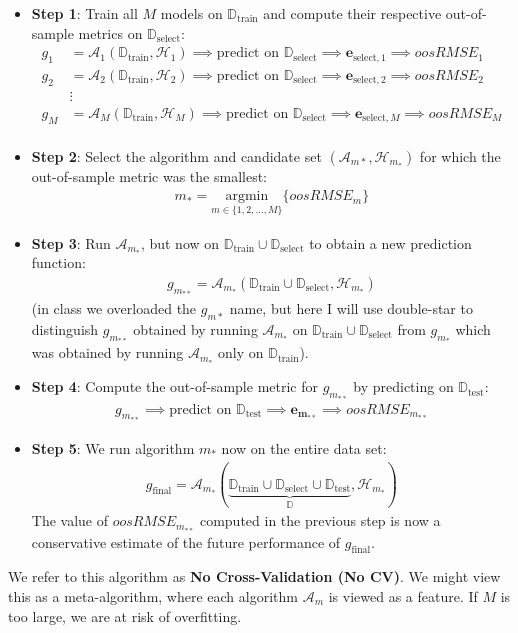 \documentclass[12pt, a4paper]{article}
\theoremstyle{definition}
\newcommand{\test}{\text{test}}
\newcommand{\train}{\text{train}}
\newcommand{\select}{\text{select}}
\newcommand{\Dtest}{\mathbb{D}_{\test}}
\newcommand{\Dtrain}{\mathbb{D}_{\train}}
\newcommand{\Dselect}{\mathbb{D}_{\select}}
\begin{document}
	\begin{itemize}
		\item \textbf{Step 1}: Train all $M$ models on $\Dtrain$ and compute their respective
		out-of-sample metrics on $\Dselect$:
		\begin{align*}
			g_1&=\mathcal{A}_1(\mathbb{D}_{\text{train}}, \mathcal{H}_{1})\implies
			\text{predict on }\Dselect\implies
			\bm{e}_{\select,1}\implies oosRMSE_1\\
			g_2&=\mathcal{A}_2(\mathbb{D}_{\text{train}}, \mathcal{H}_{2})\implies
			\text{predict on }\Dselect\implies
			\bm{e}_{\select,2}\implies oosRMSE_2\\
			&\vdots\\
			g_M&=\mathcal{A}_M(\mathbb{D}_{\text{train}}, \mathcal{H}_{M})\implies
			\text{predict on }\Dselect\implies
			\bm{e}_{\select,M}\implies oosRMSE_M\\
		\end{align*}
		\item \textbf{Step 2}: Select the algorithm and candidate set
		$(\mathcal{A}_{m*}, \mathcal{H}_{m_*})$ for which the out-of-sample metric
		was the smallest:
		\begin{align*}
			m_* = \underset{m\in \{1,2,\ldots,M\}}{\text{argmin}}\{oosRMSE_m\}
		\end{align*}
		\item \textbf{Step 3}: Run $\mathcal{A}_{m_*}$, but now on $\Dtrain\cup \Dselect$
		to obtain a new prediction function:
		\begin{align*}
			g_{m_{**}} = \mathcal{A}_{m_*}(\Dtrain \cup \Dselect, \mathcal{H}_{m_*})
		\end{align*}
		(in class we overloaded the $g_{m*}$ name, but here I will use double-star to distinguish
		$g_{m_{**}}$ obtained by running $\mathcal{A}_{m_*}$ on $\Dtrain\cup\Dselect$
		from $g_{m_*}$ which was obtained by running $\mathcal{A}_{m_*}$ only on $\Dtrain$).
		\item \textbf{Step 4}: Compute the out-of-sample metric for $g_{m_{**}}$ by predicting on $\Dtest$:
		\begin{align*}
			g_{m_{**}}\implies \text{predict on } \Dtest\implies \bm{e_{m_{**}}}\implies oosRMSE_{m_{**}}
		\end{align*}
		\item \textbf{Step 5}: We run algorithm $m_{*}$ now on the entire data set:
		\begin{align*}
			g_{\text{final}} = \mathcal{A}_{m_*}\left(
			\underbrace{\Dtrain \cup \Dselect \cup \Dtest}_{\mathbb{D}}, \mathcal{H}_{m_*}
			\right)
		\end{align*}
		The value of $oosRMSE_{m_{**}}$ computed in the previous step is now a conservative
		estimate of the future performance of $g_{\text{final}}$.
	\end{itemize}
	We refer to this algorithm as \textbf{No Cross-Validation (No CV)}.
	We might view this as a meta-algorithm, where each algorithm $\mathcal{A}_m$ is viewed
	as a feature. If $M$ is too large, we are at risk of overfitting.
\end{document}
